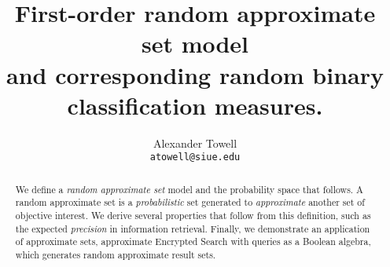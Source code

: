 \documentclass[10pt,final,hidelinks]{article}
\title
{
    First-order random approximate set model\\
    \large and corresponding random binary classification measures.
}
\author
{
    Alexander Towell\\
    \texttt{atowell@siue.edu}
}
\date{}
\numberwithin{equation}{section}
\begin{document}
\maketitle
\begin{abstract}
We define a \emph{random approximate set} model and the probability space that 
follows.
A random approximate set is a \emph{probabilistic} set generated to \emph{approximate} another set of objective interest.
We derive several properties that follow from this definition, such as the expected \emph{precision} in information retrieval.
Finally, we demonstrate an application of approximate sets, approximate Encrypted Search with queries as a Boolean algebra, which generates random approximate result sets.
\end{abstract}

\tableofcontents

%













\end{document}
